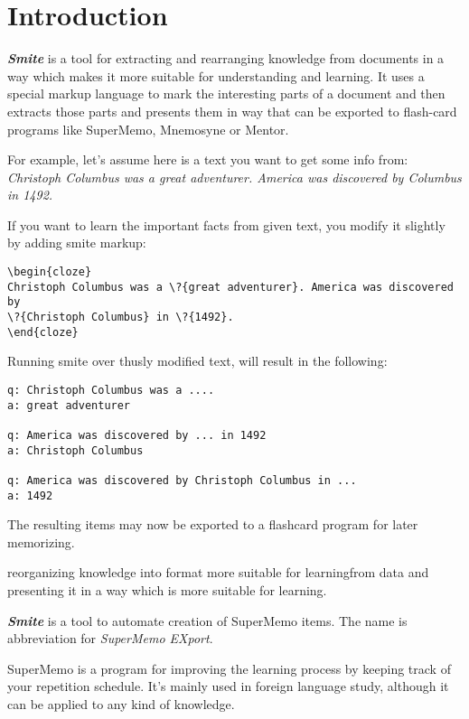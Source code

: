\documentclass[a4paper,11pt]{article}
\newcommand{\smite}{\emph{\textbf{Smite{}}}}
\begin{document}



%

%


\section{Introduction}

\smite{} is a tool for extracting and rearranging knowledge from documents in
a way which makes it more suitable for understanding and learning. It uses a
special markup language to mark the interesting parts of a document
and then extracts those parts and presents them in way that can be exported
to flash-card programs like SuperMemo, Mnemosyne or Mentor.

For example, let's assume here is a text you want to get some info from:
\textit{Christoph Columbus was a great adventurer. America was discovered by Columbus in 1492.}

If you want to learn the important facts from given text, you modify it slightly by adding smite markup:
\begin{verbatim}
\begin{cloze}
Christoph Columbus was a \?{great adventurer}. America was discovered by
\?{Christoph Columbus} in \?{1492}.
\end{cloze}
\end{verbatim}

Running smite over thusly modified text, will result in the following:
\begin{verbatim}
q: Christoph Columbus was a ....
a: great adventurer

q: America was discovered by ... in 1492
a: Christoph Columbus

q: America was discovered by Christoph Columbus in ...
a: 1492
\end{verbatim}

The resulting items may now be exported to a flashcard program for later memorizing.


reorganizing knowledge into format more suitable for
learningfrom data and presenting it in a
way which is more suitable for learning.

\smite{} is a tool to automate creation of SuperMemo items.  The name is
abbreviation for \emph{SuperMemo EXport}.

SuperMemo is a program for improving the learning process by keeping track of
your repetition schedule. It's mainly used in foreign language study, although
it can be applied to any kind of knowledge.
\end{document}
